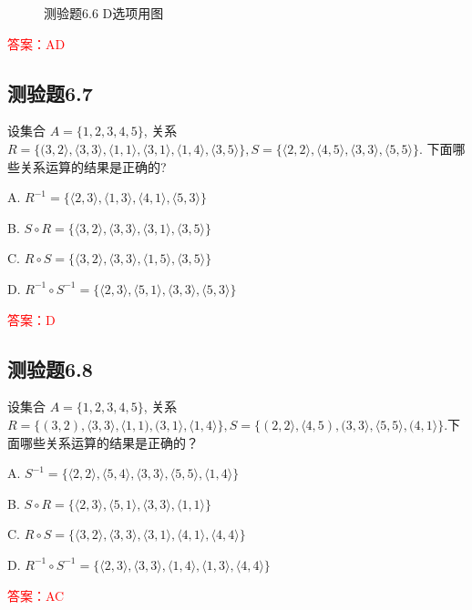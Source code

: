 \documentclass[UTF8, heading=true]{ctexart}
\begin{document}
\begin{figure}[H]
\begin{minipage}[t]{0.23\textwidth}
	      \vspace{-0.3cm}
        \caption{测验题6.6 D选项用图}
\end{minipage}
\end{figure}

\textcolor{red}{答案：AD}



\subsection{测验题6.7}

设集合 $A=\{1,2,3,4,5\}$, 关系 $R=\{(3,2\rangle,\langle 3,3\rangle,\langle 1,1\rangle,\langle 3,1\rangle,\langle 1,4\rangle,\langle 3,5\rangle\}, S=\{\langle 2,2\rangle,\langle 4,5\rangle,\langle 3,3\rangle,\langle 5,5\rangle\}$.
下面哪些关系运算的结果是正确的?

A. $R^{-1}=\{\langle 2,3\rangle,\langle 1,3\rangle,\langle 4,1\rangle,\langle 5,3\rangle\}$

B. $S \circ R=\{\langle 3,2\rangle,\langle 3,3\rangle,\langle 3,1\rangle,\langle 3,5\rangle\}$

C. $R \circ S=\{\langle 3,2\rangle,\langle 3,3\rangle,\langle 1,5\rangle,\langle 3,5\rangle\}$

D. 
$R^{-1} \circ S^{-1}=\{\langle 2,3\rangle,\langle 5,1\rangle,\langle 3,3\rangle,\langle 5,3\rangle\}$

\textcolor{red}{答案：D}


\subsection{测验题6.8}

设集合 $A=\{1,2,3,4,5\}$, 关系 $R=\{(3,2),\langle 3,3\rangle,\langle 1,1),(3,1\rangle,\langle 1,4\rangle\}, S=\{(2,2\rangle,\langle 4,5),(3,3\rangle,\langle 5,5\rangle,(4,1\rangle\}$.下面哪些关系运算的结果是正确的？

A. $S^{-1}=\{\langle 2,2\rangle,\langle 5,4\rangle,\langle 3,3\rangle,\langle 5,5\rangle,\langle 1,4\rangle\}$

B. ${S \circ R}=\{\langle 2,3\rangle,\langle 5,1\rangle,\langle 3,3\rangle,\langle 1,1\rangle\}$

C. ${R \circ S}=\{\langle 3,2\rangle,\langle 3,3\rangle,\langle 3,1\rangle,\langle 4,1\rangle,\langle 4,4\rangle\}$

D. $R^{-1} \circ S^{-1}=\{\langle 2,3\rangle,\langle 3,3\rangle,\langle 1,4\rangle,\langle 1,3\rangle,\langle 4,4\rangle\}$

\textcolor{red}{答案：AC}
\end{document}
